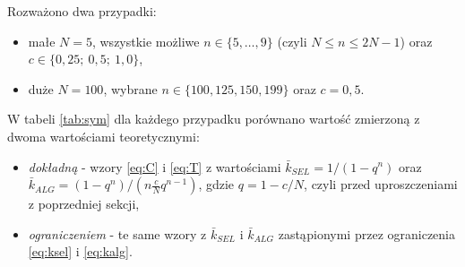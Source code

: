 \documentclass[11pt,a4paper]{article}
\begin{document}
Rozważono dwa przypadki:
\begin{itemize}
    \item małe $N=5$, wszystkie możliwe $n \in \{5,\dots,9\}$ (czyli $N \leq n \leq 2N-1$) oraz $c \in \{0{,}25;\ 0{,}5;\ 1{,}0\}$,
    \item duże $N=100$, wybrane $n \in \{100, 125, 150, 199\}$ oraz $c = 0{,}5$.
\end{itemize}

W tabeli \ref{tab:sym} dla każdego przypadku porównano wartość zmierzoną z dwoma wartościami teoretycznymi:
\begin{itemize}
    \item \emph{dokładną} - wzory \eqref{eq:C} i \eqref{eq:T} z wartościami $\bar{k}_{SEL} = 1/(1-q^n)$ oraz $\bar{k}_{ALG} = (1-q^n)/(n\frac{c}{N}q^{n-1})$, gdzie $q = 1-c/N$, 
    czyli przed uproszczeniami z poprzedniej sekcji,
    \item \emph{ograniczeniem} - te same wzory z $\bar{k}_{SEL}$ i $\bar{k}_{ALG}$ zastąpionymi przez ograniczenia \eqref{eq:ksel} i \eqref{eq:kalg}.
\end{itemize}
\end{document}
